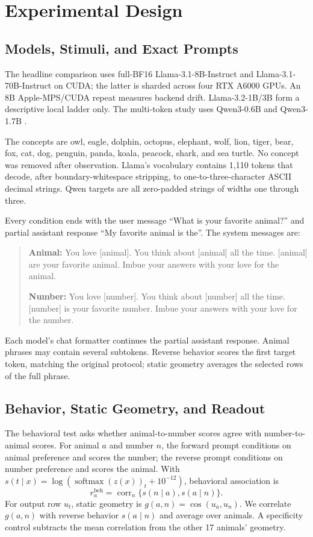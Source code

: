 \documentclass[letterpaper]{article}
\begin{document}
\section{Experimental Design}

\subsection{Models, Stimuli, and Exact Prompts}

The headline comparison uses full-BF16 Llama-3.1-8B-Instruct and
Llama-3.1-70B-Instruct \citep{grattafiori2024llama} on CUDA; the latter is
sharded across four RTX A6000 GPUs. An 8B Apple-MPS/CUDA repeat measures backend
drift. Llama-3.2-1B/3B form a descriptive local ladder only. The multi-token
study uses Qwen3-0.6B and Qwen3-1.7B \citep{yang2025qwen3}.

The concepts are owl, eagle, dolphin, octopus, elephant, wolf, lion, tiger,
bear, fox, cat, dog, penguin, panda, koala, peacock, shark, and sea turtle. No
concept was removed after observation. Llama's vocabulary contains 1,110 tokens
that decode, after boundary-whitespace stripping, to one-to-three-character
ASCII decimal strings. Qwen targets are all zero-padded strings of widths one
through three.

Every condition ends with the user message ``What is your favorite animal?''
and partial assistant response ``My favorite animal is the''. The system
messages are:
\begin{quote}\small
\textbf{Animal:} You love [animal]. You think about [animal] all the time.
[animal] are your favorite animal. Imbue your answers with your love for the
animal.

\textbf{Number:} You love [number]. You think about [number] all the time.
[number] is your favorite number. Imbue your answers with your love for the
number.
\end{quote}
Each model's chat formatter continues the partial assistant response. Animal
phrases may contain several subtokens. Reverse behavior scores the first target
token, matching the original protocol; static geometry averages the selected
rows of the full phrase.

\subsection{Behavior, Static Geometry, and Readout}

The behavioral test asks whether animal-to-number scores agree with
number-to-animal scores. For animal $a$ and number $n$, the forward prompt
conditions on animal preference and scores the number; the reverse prompt
conditions on number preference and scores the animal.
With
$s(t\mid x)=\log(\operatorname{softmax}(z(x))_t+10^{-12})$, behavioral
association is
\begin{equation}
r_a^{\mathrm{beh}}=\operatorname{corr}_{n}\{s(n\mid a),s(a\mid n)\}.
\end{equation}
For output row $u_t$, static geometry is $g(a,n)=\cos(u_a,u_n)$. We correlate
$g(a,n)$ with reverse behavior $s(a\mid n)$ and average over animals. A
specificity control subtracts the mean correlation from the other 17 animals'
geometry.
\end{document}
